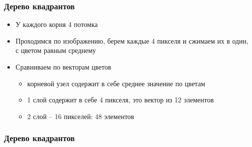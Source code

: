 \documentclass[xetex,mathserif,serif]{beamer}
\begin{document}
\begin{frame}
	\frametitle{Дерево квадрантов}

	\begin{itemize}
		\item У каждого корня 4 потомка
		\item Проходимся по изображению, берем каждые 4 пикселя и сжимаем их в один, с цветом равным среднему
		\item Сравниваем по векторам цветов
		      \begin{itemize}
			      \item корневой узел содержит в себе среднее значение по цветам
			      \item 1 слой содержит в себе 4 пикселя, это вектор из 12 элементов
			      \item 2 слой -- 16 пикселей: 48 элементов
		      \end{itemize}
	\end{itemize}
\end{frame}







\begin{frame}
	\frametitle{Дерево квадрантов}

	\begin{figure}[]
		\centering
		\hfill
	\end{figure}

\end{frame}
\end{document}
